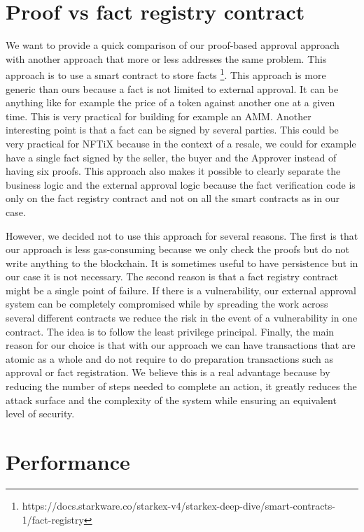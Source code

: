 \documentclass[a4paper,11pt,oneside]{report}
\begin{document}
\section{Proof vs fact registry contract}
We want to provide a quick comparison of our proof-based approval approach with another approach that more or less addresses the same problem. This approach is to use a smart contract to store facts \footnote{https://docs.starkware.co/starkex-v4/starkex-deep-dive/smart-contracts-1/fact-registry}. This approach is more generic than ours because a fact is not limited to external approval. It can be anything like for example the price of a token against another one at a given time. This is very practical for building for example an AMM. Another interesting point is that a fact can be signed by several parties. This could be very practical for NFTiX because in the context of a resale, we could for example have a single fact signed by the seller, the buyer and the Approver instead of having six proofs. This approach also makes it possible to clearly separate the business logic and the external approval logic because the fact verification code is only on the fact registry contract and not on all the smart contracts as in our case.

However, we decided not to use this approach for several reasons. The first is that our approach is less gas-consuming because we only check the proofs but do not write anything to the blockchain. It is sometimes useful to have persistence but in our case it is not necessary. The second reason is that a fact registry contract might be a single point of failure. If there is a vulnerability, our external approval system can be completely compromised while by spreading the work across several different contracts we reduce the risk in the event of a vulnerability in one contract. The idea is to follow the least privilege principal. Finally, the main reason for our choice is that with our approach we can have transactions that are atomic as a whole and do not require to do preparation transactions such as approval or fact registration. We believe this is a real advantage because by reducing the number of steps needed to complete an action, it greatly reduces the attack surface and the complexity of the system while ensuring an equivalent level of security.

\section{Performance}
\end{document}
